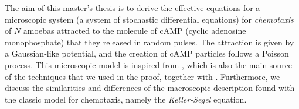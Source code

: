 The aim of this master's thesis is to derive the effective equations for a microscopic system (a system of stochastic differential equations) for \emph{chemotaxis} of $N$ amoebas attracted to the molecule of cAMP (cyclic adenosine monophosphate) that they released in random pulses.
The attraction is given by a Gaussian-like potential, and the creation of cAMP particles follows a Poisson process.
This microscopic model is inspired from \cite{ana}, which is also the main source of the techniques that we used in the proof, together with \cite{peter-boers}.
Furthermore, we discuss the similarities and differences of the macroscopic description found with the classic model for chemotaxis, namely the \emph{Keller-Segel} equation.